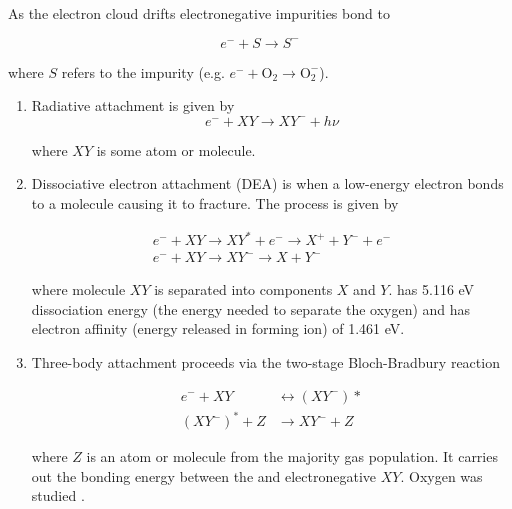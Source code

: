 As the electron cloud drifts electronegative impurities bond to \electron

\vspace{-10pt}

\begin{equation}
e^{-} + S \rightarrow S^{-}
\label{eq:impurity_attach}
\end{equation}

\noindent where $S$ refers to the impurity (e.g. $e^- + \mathrm{O_2} \rightarrow \mathrm{O_2^-}$).

\begin{enumerate}
\item Radiative attachment is given by
\vspace{-10pt}
\begin{equation}
e^- + XY \rightarrow XY^- + h \nu
\end{equation}

\vspace{-10pt}

\noindent where $XY$ is some atom or molecule.

\item Dissociative electron attachment (DEA) is when a low-energy electron bonds to a molecule causing it to fracture.  The process
is given by

\vspace{-10pt}

\begin{equation}
\begin{aligned}
e^- + XY \rightarrow XY^* + e^- \rightarrow X^+ + Y^- + e^- \\
e^- + XY \rightarrow XY^- \rightarrow X + Y^-
\end{aligned}
\end{equation}

\noindent where molecule $XY$ is separated into components $X$ and $Y$.   has 5.116 eV dissociation energy (the energy needed to
separate the oxygen) and  has electron affinity (energy released in forming ion) of 1.461 eV.

\item Three-body attachment proceeds via the two-stage Bloch-Bradbury reaction 

\vspace{-15pt}

\begin{equation}
\begin{aligned}
e^- + XY &\leftrightarrow (XY^-)* \\
(XY^-)^* + Z &\rightarrow XY^- + Z
\end{aligned}
\end{equation}

\noindent where $Z$ is an atom or molecule from the majority gas population.  It carries out the bonding energy between the
\electron and electronegative $XY$.  Oxygen was studied .
\end{enumerate}



